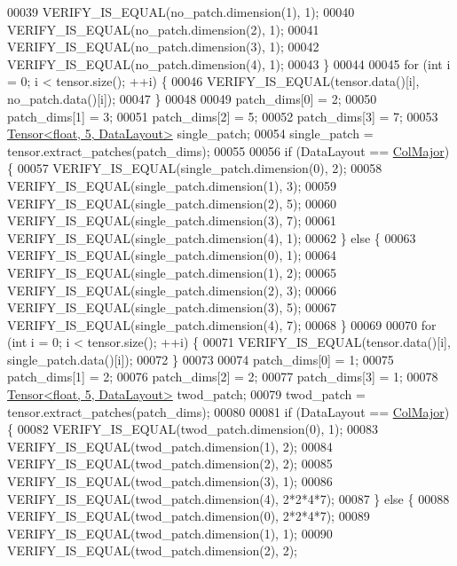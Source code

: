 \begin{DoxyCode}
00039     VERIFY\_IS\_EQUAL(no\_patch.dimension(1), 1);
00040     VERIFY\_IS\_EQUAL(no\_patch.dimension(2), 1);
00041     VERIFY\_IS\_EQUAL(no\_patch.dimension(3), 1);
00042     VERIFY\_IS\_EQUAL(no\_patch.dimension(4), 1);
00043   \}
00044 
00045   \textcolor{keywordflow}{for} (\textcolor{keywordtype}{int} i = 0; i < tensor.size(); ++i) \{
00046     VERIFY\_IS\_EQUAL(tensor.data()[i], no\_patch.data()[i]);
00047   \}
00048 
00049   patch\_dims[0] = 2;
00050   patch\_dims[1] = 3;
00051   patch\_dims[2] = 5;
00052   patch\_dims[3] = 7;
00053   \hyperlink{class_eigen_1_1_tensor}{Tensor<float, 5, DataLayout>} single\_patch;
00054   single\_patch = tensor.extract\_patches(patch\_dims);
00055 
00056   \textcolor{keywordflow}{if} (DataLayout == \hyperlink{group__enums_ggaacded1a18ae58b0f554751f6cdf9eb13a0cbd4bdd0abcfc0224c5fcb5e4f6669a}{ColMajor}) \{
00057     VERIFY\_IS\_EQUAL(single\_patch.dimension(0), 2);
00058     VERIFY\_IS\_EQUAL(single\_patch.dimension(1), 3);
00059     VERIFY\_IS\_EQUAL(single\_patch.dimension(2), 5);
00060     VERIFY\_IS\_EQUAL(single\_patch.dimension(3), 7);
00061     VERIFY\_IS\_EQUAL(single\_patch.dimension(4), 1);
00062   \} \textcolor{keywordflow}{else} \{
00063     VERIFY\_IS\_EQUAL(single\_patch.dimension(0), 1);
00064     VERIFY\_IS\_EQUAL(single\_patch.dimension(1), 2);
00065     VERIFY\_IS\_EQUAL(single\_patch.dimension(2), 3);
00066     VERIFY\_IS\_EQUAL(single\_patch.dimension(3), 5);
00067     VERIFY\_IS\_EQUAL(single\_patch.dimension(4), 7);
00068   \}
00069 
00070   \textcolor{keywordflow}{for} (\textcolor{keywordtype}{int} i = 0; i < tensor.size(); ++i) \{
00071     VERIFY\_IS\_EQUAL(tensor.data()[i], single\_patch.data()[i]);
00072   \}
00073 
00074   patch\_dims[0] = 1;
00075   patch\_dims[1] = 2;
00076   patch\_dims[2] = 2;
00077   patch\_dims[3] = 1;
00078   \hyperlink{class_eigen_1_1_tensor}{Tensor<float, 5, DataLayout>} twod\_patch;
00079   twod\_patch = tensor.extract\_patches(patch\_dims);
00080 
00081   \textcolor{keywordflow}{if} (DataLayout == \hyperlink{group__enums_ggaacded1a18ae58b0f554751f6cdf9eb13a0cbd4bdd0abcfc0224c5fcb5e4f6669a}{ColMajor}) \{
00082     VERIFY\_IS\_EQUAL(twod\_patch.dimension(0), 1);
00083     VERIFY\_IS\_EQUAL(twod\_patch.dimension(1), 2);
00084     VERIFY\_IS\_EQUAL(twod\_patch.dimension(2), 2);
00085     VERIFY\_IS\_EQUAL(twod\_patch.dimension(3), 1);
00086     VERIFY\_IS\_EQUAL(twod\_patch.dimension(4), 2*2*4*7);
00087   \} \textcolor{keywordflow}{else} \{
00088     VERIFY\_IS\_EQUAL(twod\_patch.dimension(0), 2*2*4*7);
00089     VERIFY\_IS\_EQUAL(twod\_patch.dimension(1), 1);
00090     VERIFY\_IS\_EQUAL(twod\_patch.dimension(2), 2);

\end{DoxyCode}
